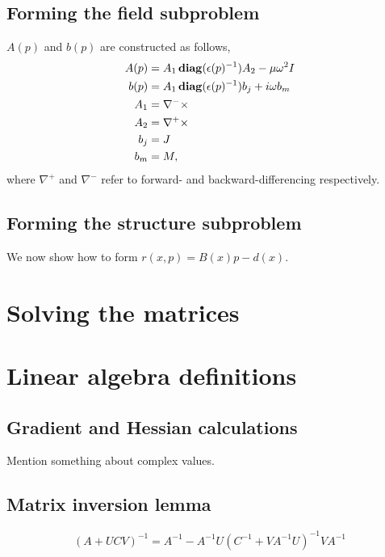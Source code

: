 \documentclass{article}
\begin{document}
\begin{appendix}
\subsection{Forming the field subproblem}
$A(p)$ and $b(p)$ are constructed as follows,
    \begin{subequations}\begin{align}
    A(p) &= A_1 \mathop{\bf diag}(\epsilon(p)^{-1}) A_2 - \mu \omega^2 I \\
    b(p) &= A_1 \mathop{\bf diag}(\epsilon(p)^{-1}) b_j + i \omega b_m \\
    A_1 &= \nabla^- \times \\
    A_2 &= \nabla^+ \times \\
    b_j &= J \\
    b_m &= M,
    \end{align}\end{subequations}
    where $\nabla^+$ and $\nabla^-$ refer to forward- and backward-differencing
    respectively.

\subsection{Forming the structure subproblem}
We now show how to form $r(x,p) = B(x)p - d(x)$.

\section{Solving the matrices}
\section{Linear algebra definitions}
\subsection{Gradient and Hessian calculations}
Mention something about complex values.
\subsection{Matrix inversion lemma}\label{inv lemma}
\begin{equation}
(A + UCV)^{-1} = A^{-1} - A^{-1}U (C^{-1} + V A^{-1} U)^{-1} V A^{-1}
\end{equation}

\end{appendix}
\end{document}
